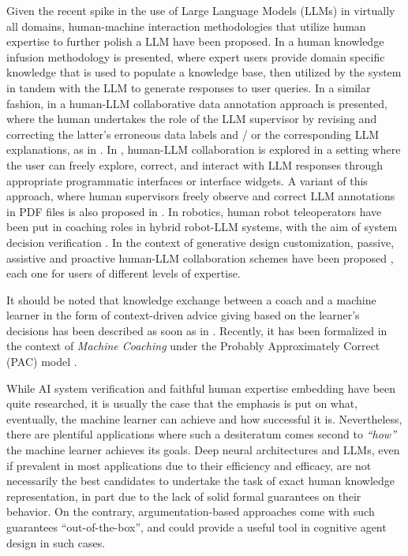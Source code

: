 \documentclass[a4paper,twoside]{article}
\begin{document}
Given the recent spike in the use of Large Language Models (LLMs) in virtually all domains, human-machine interaction methodologies that utilize human expertise to further polish a LLM have been proposed. In \cite{welz2024} a human knowledge infusion methodology is presented, where expert users provide domain specific knowledge that is used to populate a knowledge base, then utilized by the system in tandem with the LLM to generate responses to user queries. In a similar fashion, in \cite{wang2024} a human-LLM collaborative data annotation approach is presented, where the human undertakes the role of the LLM supervisor by revising and correcting the latter's erroneous data labels and / or the corresponding LLM explanations, as in \cite{tesoKerstingIML2019}. In \cite{kim2024megannohumanllmcollaborativeannotation}, human-LLM collaboration is explored in a setting where the user can freely explore, correct, and interact with LLM responses through appropriate programmatic interfaces or interface widgets. A variant of this approach, where human supervisors freely observe and correct LLM annotations in PDF files is also proposed in \cite{tang2024}. In robotics, human robot teleoperators have been put in coaching roles in hybrid robot-LLM systems, with the aim of system decision verification \cite{liu2023llmbasedhumanrobotcollaborationframework}. In the context of generative design customization, passive, assistive and proactive human-LLM collaboration schemes have been proposed \cite{WANG2025425}, each one for users of different levels of expertise.

It should be noted that knowledge exchange between a coach and a machine learner in the form of context-driven advice giving based on the learner's decisions has been described as soon as in \cite{mccarthyProgramsCommonSense1959}. Recently, it has been formalized in the context of \emph{Machine Coaching} \cite{michaelAdviceTaker2017,michaelMachineCoaching2019} under the Probably Approximately Correct (PAC) model \cite{valiantPAC1984}.

While AI system verification and faithful human expertise embedding have been quite researched, it is usually the case that the emphasis is put on what, eventually, the machine learner can achieve and how successful it is. Nevertheless, there are plentiful applications where such a desiteratum comes second to \emph{``how''} the machine learner achieves its goals. Deep neural architectures and LLMs, even if prevalent in most applications due to their efficiency and efficacy, are not necessarily the best candidates to undertake the task of exact human knowledge representation, in part due to the lack of solid formal guarantees on their behavior. On the contrary, argumentation-based approaches \cite{DUNG1995321,prakkenAnAbstractFrameworkFA2010} come with such guarantees ``out-of-the-box'', and could provide a useful tool in cognitive agent design in such cases.
%
%
%
\end{document}
